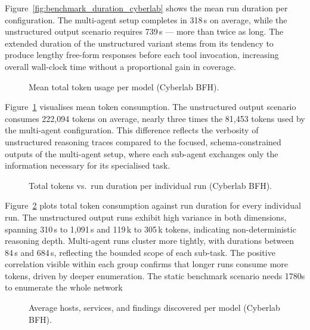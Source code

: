Figure~\ref{fig:benchmark_duration_cyberlab} shows the mean run duration per configuration.
The multi-agent setup completes in 318\,s on average, while the unstructured output scenario
requires 739\,s — more than twice as long.
The extended duration of the unstructured variant stems from its tendency to produce lengthy
free-form responses before each tool invocation, increasing overall wall-clock time without
a proportional gain in coverage.

\begin{figure}[H]
    \centering
    
    \caption{Mean total token usage per model (Cyberlab BFH).}
    \label{fig:benchmark_tokens_cyberlab}
\end{figure}

Figure~\ref{fig:benchmark_tokens_cyberlab} visualises mean token consumption.
The unstructured output scenario consumes 222,094 tokens on average, nearly three times the
81,453 tokens used by the multi-agent configuration.
This difference reflects the verbosity of unstructured reasoning traces compared to the
focused, schema-constrained outputs of the multi-agent setup, where each sub-agent exchanges
only the information necessary for its specialised task.

\begin{figure}[H]
    \centering
    
    \caption{Total tokens vs.\ run duration per individual run (Cyberlab BFH).}
    \label{fig:benchmark_scatter_cyberlab}
\end{figure}

Figure~\ref{fig:benchmark_scatter_cyberlab} plots total token consumption against run duration
for every individual run.
The unstructured output runs exhibit high variance in both dimensions, spanning 310\,s to
1{,}091\,s and 119\,k to 305\,k tokens, indicating non-deterministic reasoning depth.
Multi-agent runs cluster more tightly, with durations between 84\,s and 684\,s, reflecting
the bounded scope of each sub-task.
The positive correlation visible within each group confirms that longer runs consume more
tokens, driven by deeper enumeration.
The static benchmark scenario needs 1780s to enumerate the whole network

\begin{figure}[H]
    \centering
    
    \caption{Average hosts, services, and findings discovered per model (Cyberlab BFH).}
    \label{fig:benchmark_services_cyberlab}
\end{figure}

